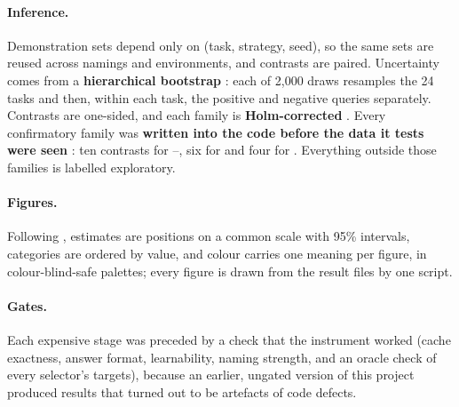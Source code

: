 \paragraph{Inference.}
Demonstration sets depend only on (task, strategy, seed), so the same sets are reused across namings and environments, and contrasts are paired.
Uncertainty comes from a \textbf{hierarchical bootstrap} \citep{efron1993introduction,davison1997bootstrap}: each of 2,000 draws resamples the 24 tasks and then, within each task, the positive and negative queries separately.
Contrasts are one-sided, and each family is \textbf{Holm-corrected} \citep{holm1979simple}.
Every confirmatory family was \textbf{written into the code before the data it tests were seen} \citep{nosek2018preregistration}: ten contrasts for --, six for \sata and four for \satami.
Everything outside those families is labelled exploratory.

\paragraph{Figures.}
Following \citet{healy2019data}, estimates are positions on a common scale with 95\% intervals, categories are ordered by value, and colour carries one meaning per figure, in colour-blind-safe palettes; every figure is drawn from the result files by one script.

\paragraph{Gates.}
Each expensive stage was preceded by a check that the instrument worked (cache exactness, answer format, learnability, naming strength, and an oracle check of every selector's targets), because an earlier, ungated version of this project produced results that turned out to be artefacts of code defects.
